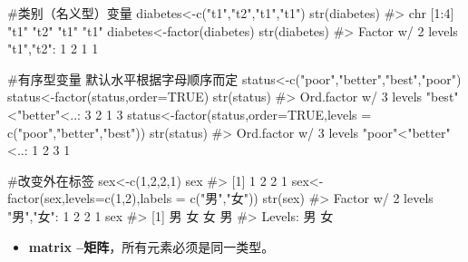\documentclass[
  letterpaper,
  DIV=11,
  numbers=noendperiod]{scrreprt}
\newenvironment{Shaded}{\begin{snugshade}}{\end{snugshade}}
\newcommand{\AttributeTok}[1]{\textcolor[rgb]{0.40,0.45,0.13}{#1}}
\newcommand{\CommentTok}[1]{\textcolor[rgb]{0.37,0.37,0.37}{#1}}
\newcommand{\ConstantTok}[1]{\textcolor[rgb]{0.56,0.35,0.01}{#1}}
\newcommand{\DecValTok}[1]{\textcolor[rgb]{0.68,0.00,0.00}{#1}}
\newcommand{\FunctionTok}[1]{\textcolor[rgb]{0.28,0.35,0.67}{#1}}
\newcommand{\NormalTok}[1]{\textcolor[rgb]{0.00,0.23,0.31}{#1}}
\newcommand{\OtherTok}[1]{\textcolor[rgb]{0.00,0.23,0.31}{#1}}
\newcommand{\StringTok}[1]{\textcolor[rgb]{0.13,0.47,0.30}{#1}}
\providecommand{\tightlist}{%
  \setlength{\itemsep}{0pt}\setlength{\parskip}{0pt}}\usepackage{longtable,booktabs,array}
\begin{document}
\begin{Shaded}
\begin{Highlighting}[]
\CommentTok{\#类别（名义型）变量}
\NormalTok{diabetes}\OtherTok{\textless{}{-}}\FunctionTok{c}\NormalTok{(}\StringTok{"t1"}\NormalTok{,}\StringTok{"t2"}\NormalTok{,}\StringTok{"t1"}\NormalTok{,}\StringTok{"t1"}\NormalTok{) }
\FunctionTok{str}\NormalTok{(diabetes)}
\CommentTok{\#\textgreater{}  chr [1:4] "t1" "t2" "t1" "t1"}
\NormalTok{diabetes}\OtherTok{\textless{}{-}}\FunctionTok{factor}\NormalTok{(diabetes)}
\FunctionTok{str}\NormalTok{(diabetes)}
\CommentTok{\#\textgreater{}  Factor w/ 2 levels "t1","t2": 1 2 1 1}


\CommentTok{\#有序型变量     默认水平根据字母顺序而定}
\NormalTok{status}\OtherTok{\textless{}{-}}\FunctionTok{c}\NormalTok{(}\StringTok{"poor"}\NormalTok{,}\StringTok{"better"}\NormalTok{,}\StringTok{"best"}\NormalTok{,}\StringTok{"poor"}\NormalTok{)}
\NormalTok{status}\OtherTok{\textless{}{-}}\FunctionTok{factor}\NormalTok{(status,}\AttributeTok{order=}\ConstantTok{TRUE}\NormalTok{) }
\FunctionTok{str}\NormalTok{(status) }
\CommentTok{\#\textgreater{}  Ord.factor w/ 3 levels "best"\textless{}"better"\textless{}..: 3 2 1 3}
\NormalTok{status}\OtherTok{\textless{}{-}}\FunctionTok{factor}\NormalTok{(status,}\AttributeTok{order=}\ConstantTok{TRUE}\NormalTok{,}\AttributeTok{levels =} \FunctionTok{c}\NormalTok{(}\StringTok{"poor"}\NormalTok{,}\StringTok{"better"}\NormalTok{,}\StringTok{"best"}\NormalTok{)) }
\FunctionTok{str}\NormalTok{(status) }
\CommentTok{\#\textgreater{}  Ord.factor w/ 3 levels "poor"\textless{}"better"\textless{}..: 1 2 3 1}

\CommentTok{\#改变外在标签}
\NormalTok{sex}\OtherTok{\textless{}{-}}\FunctionTok{c}\NormalTok{(}\DecValTok{1}\NormalTok{,}\DecValTok{2}\NormalTok{,}\DecValTok{2}\NormalTok{,}\DecValTok{1}\NormalTok{)}
\NormalTok{sex}
\CommentTok{\#\textgreater{} [1] 1 2 2 1}
\NormalTok{sex}\OtherTok{\textless{}{-}}\FunctionTok{factor}\NormalTok{(sex,}\AttributeTok{levels=}\FunctionTok{c}\NormalTok{(}\DecValTok{1}\NormalTok{,}\DecValTok{2}\NormalTok{),}\AttributeTok{labels =} \FunctionTok{c}\NormalTok{(}\StringTok{"男"}\NormalTok{,}\StringTok{"女"}\NormalTok{)) }
\FunctionTok{str}\NormalTok{(sex) }
\CommentTok{\#\textgreater{}  Factor w/ 2 levels "男","女": 1 2 2 1}
\NormalTok{sex}
\CommentTok{\#\textgreater{} [1] 男 女 女 男}
\CommentTok{\#\textgreater{} Levels: 男 女}
\end{Highlighting}
\end{Shaded}

\begin{itemize}
\tightlist
\item
  \textbf{matrix --矩阵}，所有元素必须是同一类型。
\end{itemize}
\end{document}
